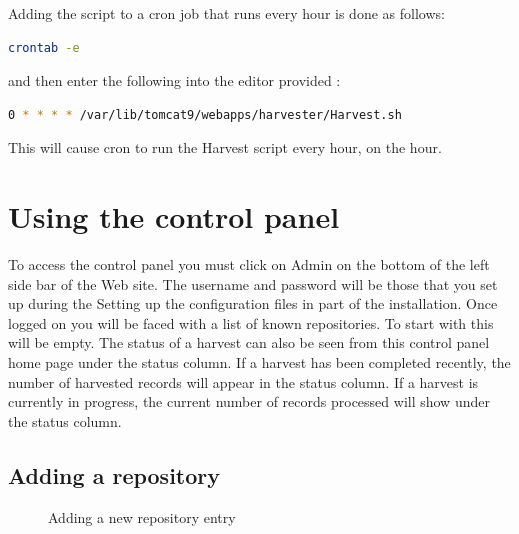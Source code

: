 \documentclass[a4paper,11pt]{article}
\begin{document}
Adding the script to a cron job that runs every hour is done as follows: 

\begin{lstlisting}[language=bash]
crontab -e
\end{lstlisting}

and then enter the following into the editor provided : 

\begin{lstlisting}[language=bash]
0 * * * * /var/lib/tomcat9/webapps/harvester/Harvest.sh
\end{lstlisting}

This will cause cron to run the Harvest script every hour, on the hour.

\section{Using the control panel}
\label{sec:using_the_control_panel}

To access the control panel you must click on Admin on the bottom of the left side bar of the Web site. The username and password will be those that you set up during the Setting up the configuration files in  part of the installation. Once logged on you will be faced with a list of known repositories. To start with this will be empty. The status of a harvest can also be seen from this control panel home page under the status column. If a harvest has been completed recently, the number of harvested records will appear in the status column. If a harvest is currently in progress, the current number of records processed will show under the status column.

\subsection{Adding a repository}
\label{sec:using_the_control_panel:adding_a_repository}

\begin{figure}[h]
 \centering
 \caption{Adding a new repository entry}
 \label{adding_repository_information}
\end{figure}
\end{document}
